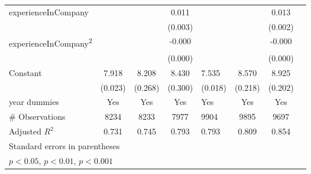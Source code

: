 \begin{longtable}{l*{3}{c}|l*{3}{c}}
		experienceInCompany &                     &                     &       0.011\sym{***}&                     &                     &       0.013\sym{***}\\
		&                     &                     &     (0.003)         &                     &                     &     (0.002)         \\
		experienceInCompany\textsuperscript{2}&                     &                     &      -0.000\sym{*}  &                     &                     &      -0.000\sym{***}\\
		&                     &                     &     (0.000)         &                     &                     &     (0.000)         \\
		Constant            &       7.918\sym{***}&       8.208\sym{***}&       8.430\sym{***}&       7.535\sym{***}&       8.570\sym{***}&       8.925\sym{***}\\
		&     (0.023)         &     (0.268)         &     (0.300)         &     (0.018)         &     (0.218)         &     (0.202)         \\
		year dummies        &         Yes         &         Yes         &         Yes         &         Yes         &         Yes         &         Yes         \\
		\midrule
	\#	Observations        &        8234         &        8233         &        7977         &        9904         &        9895         &        9697         \\
		Adjusted \(R^{2}\)  &       0.731         &       0.745         &       0.793         &       0.793         &       0.809         &       0.854         \\
		\bottomrule
		\multicolumn{7}{l}{\footnotesize Standard errors in parentheses}\\
		\multicolumn{7}{l}{\footnotesize \sym{*} \(p<0.05\),
          \sym{**} \(p<0.01\), \sym{***} \(p<0.001\)}
          \label{tab:ru_wage_full}
	\end{longtable}
\industry\\
\occupation
